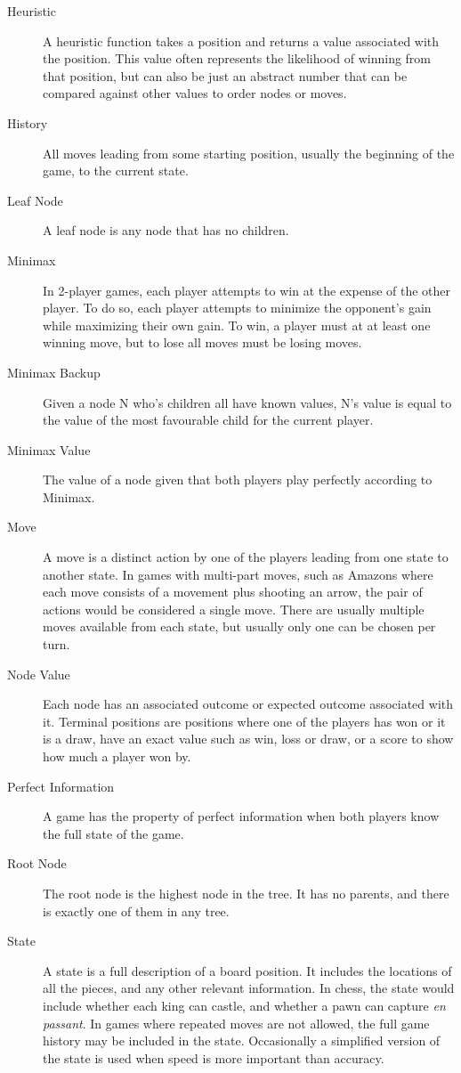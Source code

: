 \begin{description}
\item[Heuristic] A heuristic function takes a position and returns a value associated with the position. This value often represents the likelihood of winning from that position, but can also be just an abstract number that can be compared against other values to order nodes or moves.
\item[History] All moves leading from some starting position, usually the beginning of the game, to the current state.
\item[Leaf Node] A leaf node is any node that has no children.
\item[Minimax] In 2-player games, each player attempts to win at the expense of the other player. To do so, each player attempts to minimize the opponent's gain while maximizing their own gain. To win, a player must at at least one winning move, but to lose all moves must be losing moves.
\item[Minimax Backup] Given a node N who's children all have known values, N's value is equal to the value of the most favourable child for the current player.
\item[Minimax Value] The value of a node given that both players play perfectly according to Minimax.
\item[Move] A move is a distinct action by one of the players leading from one state to another state. In games with multi-part moves, such as Amazons where each move consists of a movement plus shooting an arrow, the pair of actions would be considered a single move. There are usually multiple moves available from each state, but usually only one can be chosen per turn.
\item[Node Value] Each node has an associated outcome or expected outcome associated with it. Terminal positions are positions where one of the players has won or it is a draw, have an exact value such as win, loss or draw, or a score to show how much a player won by.
\item[Perfect Information] A game has the property of perfect information when both players know the full state of the game.
\item[Root Node] The root node is the highest node in the tree. It has no parents, and there is exactly one of them in any tree.
\item[State] A state is a full description of a board position. It includes the locations of all the pieces, and any other relevant information. In chess, the state would include whether each king can castle, and whether a pawn can capture \textit{en passant}. In games where repeated moves are not allowed, the full game history may be included in the state. Occasionally a simplified version of the state is used when speed is more important than accuracy.

\end{description}
